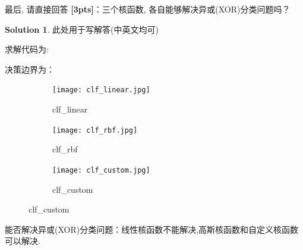 \documentclass[a4paper,UTF8]{article}
\numberwithin{equation}{section}
\theoremstyle{definition}
\newtheorem*{solution}{Solution}
\begin{document}
最后, 请直接回答 \textbf{[3pts]}：三个核函数, 各自能够解决异或(XOR)分类问题吗？

\begin{solution}
    此处用于写解答(中英文均可)
    
    求解代码为:
    
    
    决策边界为：
     \begin{figure}[h]
        \centering
         \begin{subfigure}[b]{0.3\textwidth}
             \texttt{[image: clf\_linear.jpg]}
             \caption{clf\_linear}
         \end{subfigure}
         \begin{subfigure}[b]{0.3\textwidth}
             \texttt{[image: clf\_rbf.jpg]}
             \caption{clf\_rbf}
         \end{subfigure}
        \begin{subfigure}[b]{0.3\textwidth}
            \texttt{[image: clf\_custom.jpg]}
           \caption{clf\_custom}
        \end{subfigure}
     \end{figure}
        
    能否解决异或(XOR)分类问题：线性核函数不能解决,高斯核函数和自定义核函数可以解决.
\end{solution}

\newpage
\end{document}
